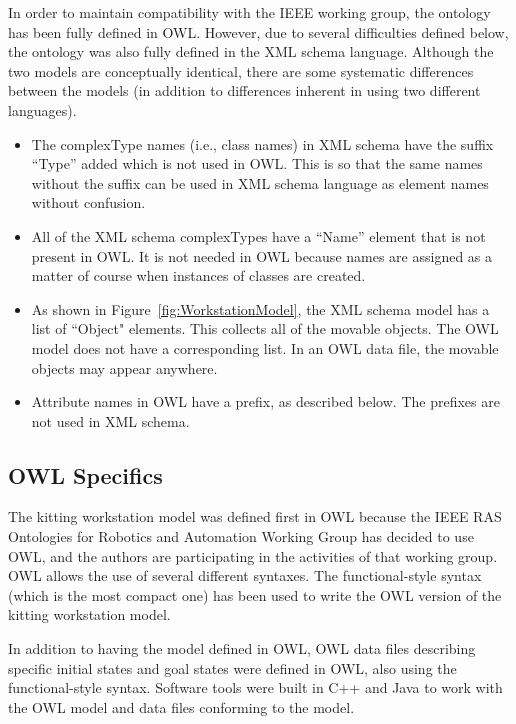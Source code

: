 In order to maintain compatibility with the IEEE working group,
the ontology has been fully defined in OWL. However, due to
several difficulties defined below, the ontology was also fully defined
in the XML schema language. 
Although the two 
models are conceptually identical, there
are some systematic differences between the models (in addition to
differences inherent in using two different languages).

\begin{itemize}
\item The complexType names (i.e., class names) in XML schema have the
  suffix ``Type'' added which is not used in OWL. This is so that the same
  names without the suffix can be used in XML schema language as element
  names without confusion.

\item All of the XML schema complexTypes have a ``Name'' element that is
  not present in OWL. It is not needed in OWL because names are assigned as
  a matter of course when instances of classes are created.

\item As shown in Figure~\ref{fig:WorkstationModel}, the XML schema model has a list of ``Object"
elements. This collects all of the movable objects. The OWL model does not
have a corresponding list. In an OWL data file, the movable objects may
appear anywhere.

\item Attribute names in OWL have a prefix, as described below. The
  prefixes are not used in XML schema.
\end{itemize}

\subsection{OWL Specifics}
The kitting workstation model was defined first in OWL because the IEEE RAS
Ontologies for Robotics and Automation Working Group has decided to use
OWL, and the authors are participating in the activities of that working
group. OWL allows the use of several different syntaxes. The
functional-style syntax (which is the most compact one) has been used to
write the OWL version of the kitting workstation model.

In addition to having the model defined in OWL, OWL data files describing
specific initial states and goal states were defined in OWL, also using the
functional-style syntax.  Software tools were built in C++ and Java to work with the
OWL model and data files conforming to the model.


